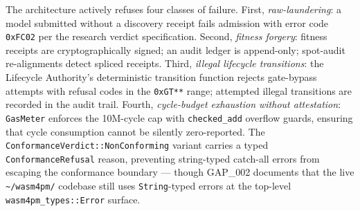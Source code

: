 The architecture actively refuses four classes of failure. First, \emph{raw-laundering}: a model
submitted without a discovery receipt fails admission with error code \texttt{0xFC02} per the
research verdict specification. Second, \emph{fitness forgery}: fitness receipts are
cryptographically signed; an audit ledger is append-only; spot-audit re-alignments detect
spliced receipts. Third, \emph{illegal lifecycle transitions}: the Lifecycle Authority's
deterministic transition function rejects gate-bypass attempts with refusal codes in the
\texttt{0xGT**} range; attempted illegal transitions are recorded in the audit trail. Fourth,
\emph{cycle-budget exhaustion without attestation}: \texttt{GasMeter} enforces the 10M-cycle cap
with \texttt{checked\_add} overflow guards, ensuring that cycle consumption cannot be
silently zero-reported. The \texttt{ConformanceVerdict::NonConforming} variant carries a typed
\texttt{ConformanceRefusal} reason, preventing string-typed catch-all errors from escaping the
conformance boundary — though GAP\_002 documents that the live \texttt{\textasciitilde/wasm4pm/}
codebase still uses \texttt{String}-typed errors at the top-level \texttt{wasm4pm\_types::Error}
surface.
